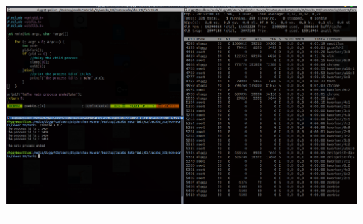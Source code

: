 \documentclass{article}
\begin{document}
\includegraphics[scale=0.27]{image/5.png}\\


\noindent\rule{18cm}{0.4pt}
\end{document}
